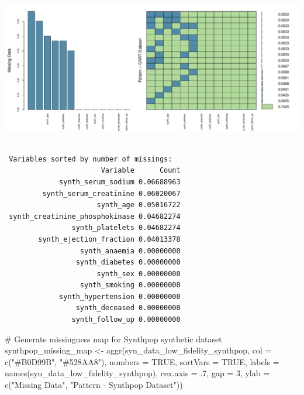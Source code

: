 \documentclass[
  letterpaper,
  DIV=11,
  numbers=noendperiod]{scrartcl}
\newenvironment{Shaded}{\begin{snugshade}}{\end{snugshade}}
\newcommand{\AttributeTok}[1]{\textcolor[rgb]{0.40,0.45,0.13}{#1}}
\newcommand{\CommentTok}[1]{\textcolor[rgb]{0.37,0.37,0.37}{#1}}
\newcommand{\ConstantTok}[1]{\textcolor[rgb]{0.56,0.35,0.01}{#1}}
\newcommand{\DecValTok}[1]{\textcolor[rgb]{0.68,0.00,0.00}{#1}}
\newcommand{\FunctionTok}[1]{\textcolor[rgb]{0.28,0.35,0.67}{#1}}
\newcommand{\NormalTok}[1]{\textcolor[rgb]{0.00,0.23,0.31}{#1}}
\newcommand{\OtherTok}[1]{\textcolor[rgb]{0.00,0.23,0.31}{#1}}
\newcommand{\StringTok}[1]{\textcolor[rgb]{0.13,0.47,0.30}{#1}}
\begin{document}
\begin{center}
\includegraphics[width=1\linewidth,height=\textheight,keepaspectratio]{heart_failure_synthetic_data_project_files/figure-pdf/Missingness Maps-3.pdf}
\end{center}

\begin{verbatim}

 Variables sorted by number of missings: 
                       Variable      Count
             synth_serum_sodium 0.06688963
         synth_serum_creatinine 0.06020067
                      synth_age 0.05016722
 synth_creatinine_phosphokinase 0.04682274
                synth_platelets 0.04682274
        synth_ejection_fraction 0.04013378
                  synth_anaemia 0.00000000
                 synth_diabetes 0.00000000
                      synth_sex 0.00000000
                  synth_smoking 0.00000000
             synth_hypertension 0.00000000
                 synth_deceased 0.00000000
                synth_follow_up 0.00000000
\end{verbatim}

\begin{Shaded}
\begin{Highlighting}[]
\CommentTok{\# Generate missingness map for Synthpop synthetic dataset}
\NormalTok{synthpop\_missing\_map }\OtherTok{\textless{}{-}} \FunctionTok{aggr}\NormalTok{(syn\_data\_low\_fidelity\_synthpop, }\AttributeTok{col =} \FunctionTok{c}\NormalTok{(}\StringTok{"\#B0D99B"}\NormalTok{, }\StringTok{"\#528AA8"}\NormalTok{),}
                             \AttributeTok{numbers =} \ConstantTok{TRUE}\NormalTok{, }\AttributeTok{sortVars =} \ConstantTok{TRUE}\NormalTok{,}
                             \AttributeTok{labels =} \FunctionTok{names}\NormalTok{(syn\_data\_low\_fidelity\_synthpop), }\AttributeTok{cex.axis =}\NormalTok{ .}\DecValTok{7}\NormalTok{,}
                             \AttributeTok{gap =} \DecValTok{3}\NormalTok{, }\AttributeTok{ylab =} \FunctionTok{c}\NormalTok{(}\StringTok{"Missing Data"}\NormalTok{, }\StringTok{"Pattern {-} Synthpop Dataset"}\NormalTok{))}
\end{Highlighting}
\end{Shaded}
\end{document}
